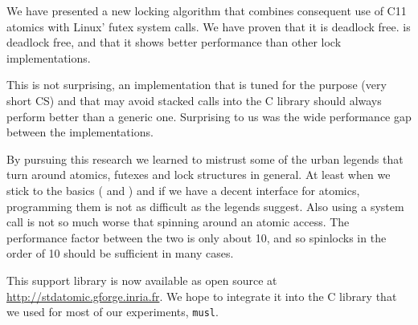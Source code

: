 We have presented a new locking algorithm that combines consequent use
of C11 atomics with Linux' futex system calls. We have proven that it
is deadlock free.
is deadlock free, and that it shows better
performance than other lock implementations.

This is not surprising, an implementation that is tuned
for the purpose (very short CS) and that may avoid stacked calls into
the C library should always perform better than a generic one.
Surprising to us was the wide performance gap between the
implementations.

By pursuing this research we learned to mistrust some of the
urban legends that turn around atomics, futexes and lock structures in
general. At least when we stick to the basics ( and
) and if we have a decent interface for atomics,
programming them is not as difficult as the legends suggest. Also
using a system call is not so much worse that spinning around an
atomic access. The performance factor between the two is only about
10, and so spinlocks in the order of 10 should be sufficient in many
cases.

This support library is now available as open source at
\url{http://stdatomic.gforge.inria.fr}. We hope to integrate it into the C library
that we used for most of our experiments, \texttt{musl}.


